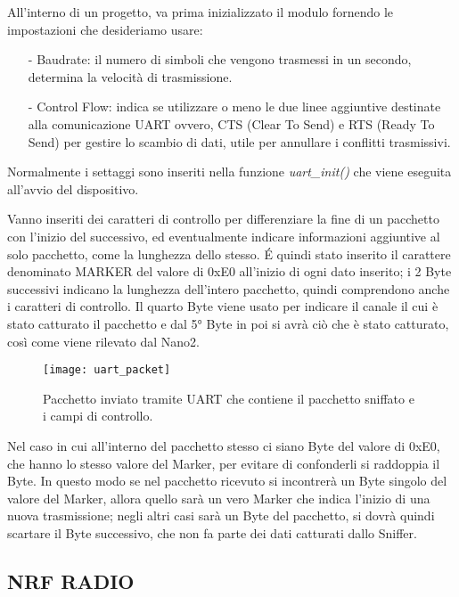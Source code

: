 \begin{samepage}
All'interno di un progetto, va prima inizializzato il modulo fornendo le impostazioni che desideriamo usare:
\begin{itemize}
\item[-] Baudrate: il numero di simboli che vengono trasmessi in un secondo, determina la velocità di trasmissione.
\item[-] Control Flow: indica se utilizzare o meno le due linee aggiuntive destinate alla comunicazione UART ovvero, CTS (Clear To Send) e RTS (Ready To Send) per gestire lo scambio di dati, utile per annullare i conflitti trasmissivi.
\end{itemize}
Normalmente i settaggi sono inseriti nella funzione \emph{uart\_init()} che viene eseguita all'avvio del dispositivo.
\end{samepage}

Vanno inseriti dei caratteri di controllo per differenziare la fine di un pacchetto con l'inizio del successivo, ed eventualmente indicare informazioni aggiuntive al solo pacchetto, come la lunghezza dello stesso. \'E quindi stato inserito il carattere denominato MARKER del valore di 0xE0 all'inizio di ogni dato inserito; i 2 Byte successivi indicano la lunghezza dell'intero pacchetto, quindi comprendono anche i caratteri di controllo. Il quarto Byte viene usato per indicare il canale il cui è stato catturato il pacchetto e dal 5° Byte in poi si avrà ciò che è stato catturato, così come viene rilevato dal Nano2.
\begin{figure}[H]
\texttt{[image: uart\_packet]}
\centering
\caption{Pacchetto inviato tramite UART che contiene il pacchetto sniffato e i campi di controllo.}
\end{figure}
Nel caso in cui all'interno del pacchetto stesso ci siano Byte del valore di 0xE0, che hanno lo stesso valore del Marker, per evitare di confonderli si raddoppia il Byte. In questo modo se nel pacchetto ricevuto si incontrerà un Byte singolo del valore del Marker, allora quello sarà un vero Marker che indica l'inizio di una nuova trasmissione; negli altri casi sarà un Byte del pacchetto, si dovrà quindi scartare il Byte successivo, che non fa parte dei dati catturati dallo Sniffer.

\subsection{NRF RADIO}

